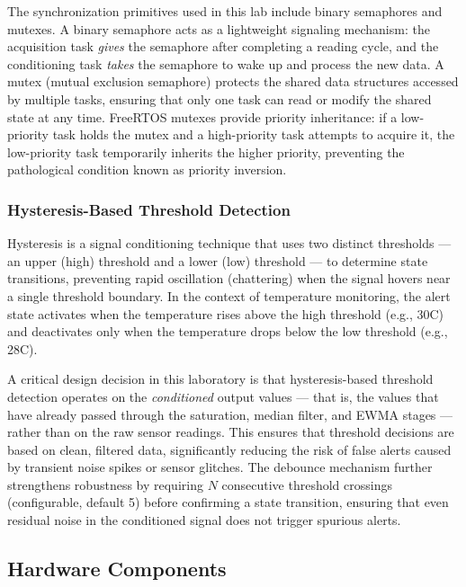 The synchronization primitives used in this lab include binary semaphores and mutexes. A binary semaphore acts as a lightweight signaling mechanism: the acquisition task \textit{gives} the semaphore after completing a reading cycle, and the conditioning task \textit{takes} the semaphore to wake up and process the new data. A mutex (mutual exclusion semaphore) protects the shared data structures accessed by multiple tasks, ensuring that only one task can read or modify the shared state at any time. FreeRTOS mutexes provide priority inheritance: if a low-priority task holds the mutex and a high-priority task attempts to acquire it, the low-priority task temporarily inherits the higher priority, preventing the pathological condition known as priority inversion.

\subsubsection{Hysteresis-Based Threshold Detection}

Hysteresis is a signal conditioning technique that uses two distinct thresholds --- an upper (high) threshold and a lower (low) threshold --- to determine state transitions, preventing rapid oscillation (chattering) when the signal hovers near a single threshold boundary. In the context of temperature monitoring, the alert state activates when the temperature rises above the high threshold (e.g., 30\textdegree C) and deactivates only when the temperature drops below the low threshold (e.g., 28\textdegree C).

A critical design decision in this laboratory is that hysteresis-based threshold detection operates on the \textit{conditioned} output values --- that is, the values that have already passed through the saturation, median filter, and EWMA stages --- rather than on the raw sensor readings. This ensures that threshold decisions are based on clean, filtered data, significantly reducing the risk of false alerts caused by transient noise spikes or sensor glitches. The debounce mechanism further strengthens robustness by requiring $N$ consecutive threshold crossings (configurable, default 5) before confirming a state transition, ensuring that even residual noise in the conditioned signal does not trigger spurious alerts.

\subsection{Hardware Components}

